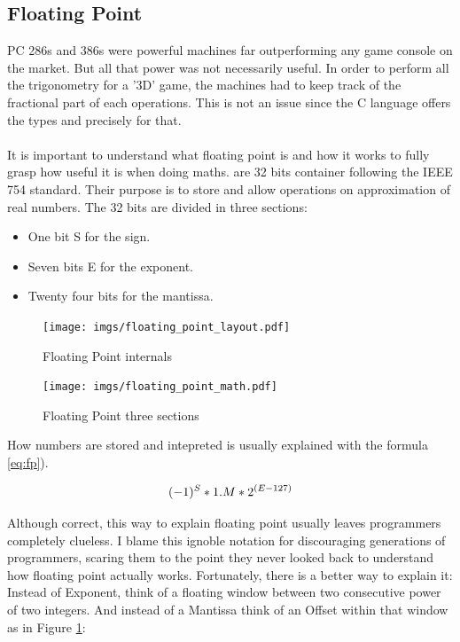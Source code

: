 \documentclass[book.tex]{subfiles}
\begin{document}
  \subsection{Floating Point}
  
   PC 286s and 386s were powerful machines far outperforming any game console on the market. But all that power was not necessarily useful. In order to perform all the trigonometry for a '3D' game, the machines had to keep track of the fractional part of each operations. This is not an issue since the C language offers the types  and  precisely for that.\\
\\
It is important to understand what floating point is and how it works to fully grasp how useful it is when doing maths.  are 32 bits container following the IEEE 754 standard. Their purpose is to store and allow operations on approximation of real numbers. The 32 bits are divided in three sections:\\
\begin{itemize}
  \item One bit S for the sign.
  \item Seven bits E for the exponent.
  \item Twenty four bits for the mantissa.
\end{itemize} 

\begin{figure}[H]
\centering
\texttt{[image: imgs/floating\_point\_layout.pdf]}
\caption{Floating Point internals}
\label{fig:fp_internals}
\end{figure}
  \bigskip



\begin{figure}[H]
\centering
\texttt{[image: imgs/floating\_point\_math.pdf]}
\caption{Floating Point three sections}
\label{fig:fp_regions}
\end{figure}
  \bigskip  


How numbers are stored and intepreted is usually explained with the formula \ref{eq:fp}).\


\begin{equation}\label{eq:fp}
\large
(-1)^S * 1.M * 2^{(E-127)}
\end{equation}
 
\bigskip  
Although correct, this way to explain floating point usually leaves programmers completely clueless. I blame this ignoble notation for discouraging generations of programmers, scaring them to the point they never looked back to understand how floating point actually works. Fortunately, there is a better way to explain it: Instead of Exponent, think of a floating window between two consecutive power of two integers. And instead of a Mantissa think of an Offset within that window as in Figure \ref{fig:fp_internals}:
  
\end{document}
